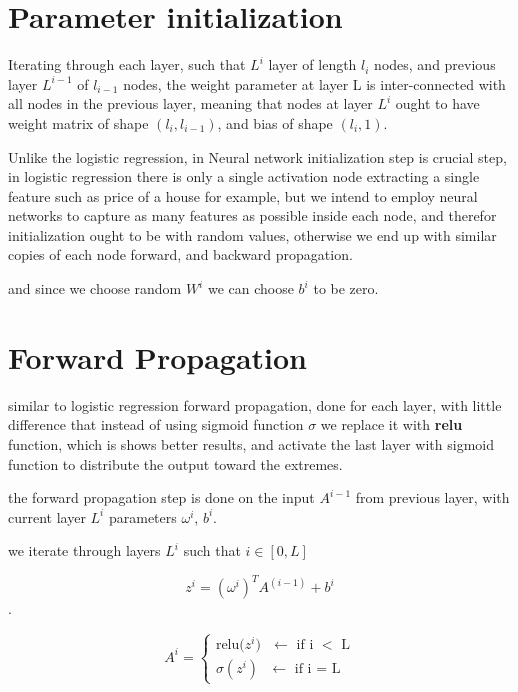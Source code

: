 \documentclass[4apaper,12pt]{book}
\begin{document}
\section{Parameter initialization}
\begin{description}
\item Iterating through each layer, such that $L^i$ layer of length $l_i$ nodes, and previous layer $L^{i-1}$ of $l_{i-1}$ nodes, the weight parameter at layer L is inter-connected with all nodes in the previous layer, meaning that nodes at layer $L^i$ ought to have weight matrix of shape $(l_i, l_{i-1})$, and bias of shape $(l_i,1)$.
\item Unlike the logistic regression, in Neural network initialization step is crucial step, in logistic regression there is only a single activation node extracting a single feature such as price of a house for example, but we intend to employ neural networks to capture as many features as possible inside each node, and therefor initialization ought to be with random values, otherwise we end up with similar copies of each node forward, and backward propagation.
\item and since we choose random $W^i$ we can choose $b^i$ to be zero.
\end{description}

\section{Forward Propagation}
\begin{description}
\item similar to logistic regression forward propagation, done for each layer, with little difference that instead of using sigmoid function $\sigma$ we replace it with \textbf{relu} function, which is shows better results, and activate the last layer with sigmoid function to distribute the output toward the extremes.
\item the forward propagation step is done on the input $A^{i-1}$ from previous layer, with current layer $L^i$ parameters $\omega^i$, $b^i$.
  \item we iterate through layers $L^i$ such that $i \in [0,L]$
\item  $$z^i=(\omega^i)^TA^{(i-1)}+b^i$$.
\item $$
  A^i=\begin{cases}
  \text{relu{($z^i$)} $\leftarrow$ if i $<$ L} \\
  \text{$\sigma(z^i)$ $\leftarrow$ if i = L}
  \end{cases}
  $$

\end{description}
\end{document}
